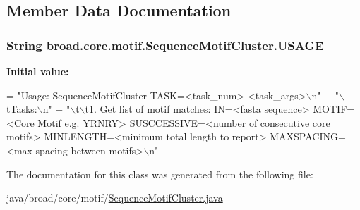 \subsection{Member Data Documentation}
\hypertarget{classbroad_1_1core_1_1motif_1_1_sequence_motif_cluster_afdd00c1c9760fca6b80faa7fa1d560b1}{
\subsubsection[{U\+S\+A\+G\+E}]{\setlength{\rightskip}{0pt plus 5cm}String broad.\+core.\+motif.\+Sequence\+Motif\+Cluster.\+U\+S\+A\+G\+E\hspace{0.3cm}{\ttfamily [static]}}}\label{classbroad_1_1core_1_1motif_1_1_sequence_motif_cluster_afdd00c1c9760fca6b80faa7fa1d560b1}
{\bfseries Initial value\+:}
\begin{DoxyCode}
= \textcolor{stringliteral}{"Usage: SequenceMotifCluster TASK=<task\_num> <task\_args>\(\backslash\)n"} +
    \textcolor{stringliteral}{"\(\backslash\)tTasks:\(\backslash\)n"} +
    \textcolor{stringliteral}{"\(\backslash\)t\(\backslash\)t1. Get list of motif matches: IN=<fasta sequence> MOTIF=<Core Motif e.g. YRNRY>
       SUSCCESSIVE=<number of consecutive core motifs> MINLENGTH=<minimum total length to report> MAXSPACING=<max spacing between
       motifs>\(\backslash\)n"}
\end{DoxyCode}


The documentation for this class was generated from the following file\+:\begin{DoxyCompactItemize}
\item 
java/broad/core/motif/\hyperlink{_sequence_motif_cluster_8java}{Sequence\+Motif\+Cluster.\+java}\end{DoxyCompactItemize}
